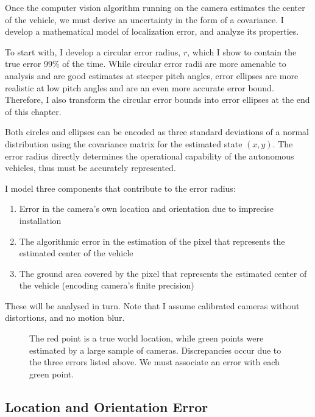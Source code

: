 \documentclass[a4paper,12pt,twoside,openright]{report}
\begin{document}
Once the computer vision algorithm running on the camera estimates the center of the vehicle,
we must derive an uncertainty in the form of a covariance. I develop a mathematical model of localization error,
and analyze its properties. 

To start with, I develop a circular error radius, $r$, which I show to contain
the true error 99\% of the time. While circular error radii are more amenable to analysis and are good
estimates at steeper pitch angles, error ellipses are more realistic at low pitch angles and are an 
even more accurate error bound. Therefore, I also transform the circular error bounds into error ellipses at the end of this chapter.

Both circles and ellipses can be encoded as three standard deviations of a normal distribution
using the covariance matrix for the estimated state $(x,y)$. The error radius directly determines
the operational capability of the autonomous vehicles, thus must be accurately represented.

I model three components that contribute to the error radius:
\begin{enumerate}
    \item Error in the camera's own location and orientation due to imprecise installation
    \item The algorithmic error in the estimation of the pixel that represents the estimated center of the vehicle
    \item The ground area covered by the pixel that represents the estimated center of the vehicle (encoding camera's finite precision)
\end{enumerate}
 
These will be analysed in turn. Note that I assume calibrated cameras without distortions, and no motion blur.


\begin{figure}[htb]
    \begin{center}
        
    \end{center}
    \caption[Example Predictions about a World Point]{The red point is a true world location, while green points were
    estimated by a large sample of cameras. Discrepancies occur due to the three errors listed above. We must associate an error with each green point.}
    \label{fig:camera:dist}
\end{figure}



\subsection{Location and Orientation Error}
\end{document}
